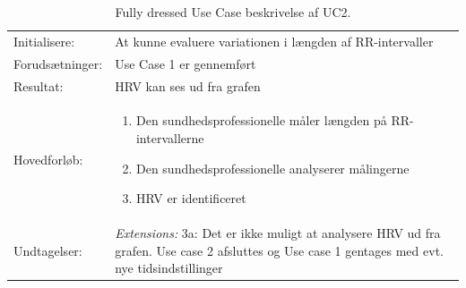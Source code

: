 \begin{table}[H]
\begin{tabularx}{\textwidth}{l X}
     Initialisere:          & 	At kunne evaluere variationen i længden af RR-intervaller
		 \\ \addlinespace[1mm]                                                                                                                                                                                                                                                                                                             
     Forudsætninger:        & 	Use Case 1 er gennemført                                                                                                                                                                                                                                                                                                                                                                                                                                                                                                                                                                           \\ \addlinespace[1mm]                                                                                                                                                       
     Resultat:              & 	HRV kan ses ud fra grafen                                                                                                                                                                                                                                                                                                                                                                                                                                                                                                                          \\ \midrule \addlinespace[1mm]                                                                                                                                                       
     Hovedforløb:           &  \begin{enumerate}
     						   \item Den sundhedsprofessionelle måler længden på RR-intervallerne
     						   \item Den sundhedsprofessionelle analyserer målingerne
     						   \item HRV er identificeret
\newline						[Extensions 3a: HRV er ikke identificerbart]
     						   \end{enumerate}
\\ \midrule 
 	Undtagelser:           & \textit{Extensions:}
\newline					 3a: Det er ikke muligt at analysere HRV ud fra grafen. Use case 2 afsluttes og Use case 1 gentages med evt. nye tidsindstillinger
\\ \bottomrule
    \end{tabularx}
    \caption {Fully dressed Use Case beskrivelse af UC2.}
    \label{tab:UC2}
\end{table}

